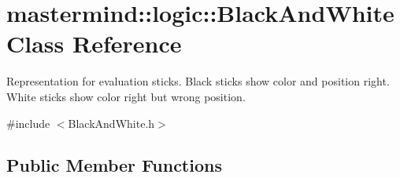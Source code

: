 \hypertarget{classmastermind_1_1logic_1_1_black_and_white}{}\section{mastermind\+:\+:logic\+:\+:Black\+And\+White Class Reference}
\label{classmastermind_1_1logic_1_1_black_and_white}


Representation for evaluation sticks. Black sticks show color and position right. White sticks show color right but wrong position.  




{\ttfamily \#include $<$Black\+And\+White.\+h$>$}

\subsection*{Public Member Functions}
